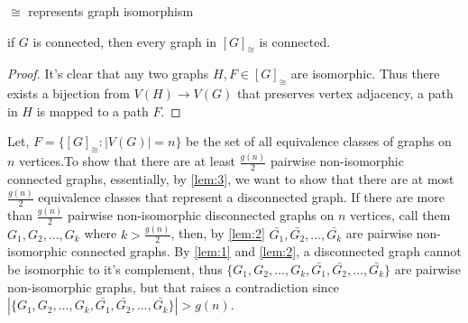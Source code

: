 \documentclass[12pt]{article}
\begin{document}
$\cong$ represents graph isomorphism
\begin{lemma}\label{lem:3}
	if $G$ is connected, then every graph in $[G]_{\cong}$ is connected. 
\end{lemma}
\begin{proof}
It's clear that any two graphs $H,F \in [G]_{\cong}$ are isomorphic. Thus there exists a bijection from $V(H) \to V(G)$ that preserves vertex adjacency, a path in $H$ is mapped to a path $F$. 
\end{proof}
Let, $F = \{ [G]_{\cong} \colon |V(G)| = n\}$ be the set of all equivalence classes of graphs on $n$ vertices.To show that there are at least $\frac{g(n)}{2}$ pairwise non-isomorphic connected graphs, essentially, by \ref{lem:3}, we want to show that there are at most $\frac{g(n)}{2}$ equivalence classes that represent a disconnected graph. If there are more than $\frac{g(n)}{2}$ pairwise non-isomorphic disconnected graphs on $n$ vertices, call them $G_1, G_2, \ldots, G_k$ where $k > \frac{g(n)}{2}$, then, by \ref{lem:2} $\bar{G_1}, \bar{G_2}, \ldots, \bar{G_k}$ are pairwise non-isomorphic connected graphs. By \ref{lem:1} and \ref{lem:2}, a disconnected graph cannot be isomorphic to it's complement, thus $\{G_1, G_2, \ldots, G_k, \bar{G_1}, \bar{G_2},\ldots, \bar{G_k}\}$ are pairwise non-isomorphic graphs, but that raises a contradiction since $|\{G_1, G_2, \ldots, G_k, \bar{G_1}, \bar{G_2},\ldots, \bar{G_k}\}| > g(n)$.  
\end{document}
